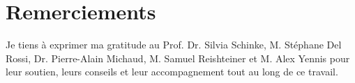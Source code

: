 \documentclass[
    iai, %
    eai, %
]{heig-tb}
\begin{document}
\maketitle
\frontmatter
\clearemptydoublepage



\tableofcontents
\let\cleardoublepage\clearpage




\mainmatter


\clearpage
\printbibliography

  \listoffigures
  \let\cleardoublepage\clearpage
  \listoftables
  \let\cleardoublepage\clearpage

\printnomenclature
\clearemptydoublepage
{}
\chapter*{Remerciements}

Je tiens à exprimer ma gratitude au Prof. Dr. Silvia Schinke, M. Stéphane Del Rossi, Dr. Pierre-Alain Michaud, M. Samuel Reishteiner et M. Alex Yennis pour leur soutien, leurs conseils et leur accompagnement tout au long de ce travail.
\appendix
\appendixpage
\addappheadtotoc


\let\cleardoublepage\clearpage
\backmatter

\label{glossaire}
\printnoidxglossary



\end{document}
